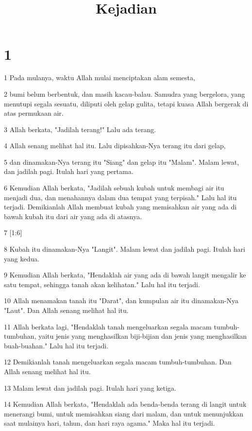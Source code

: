 

\title{Kejadian}


\chapter{1}

\par 1 Pada mulanya, waktu Allah mulai menciptakan alam semesta,
\par 2 bumi belum berbentuk, dan masih kacau-balau. Samudra yang bergelora, yang menutupi segala sesuatu, diliputi oleh gelap gulita, tetapi kuasa Allah bergerak di atas permukaan air.
\par 3 Allah berkata, "Jadilah terang!" Lalu ada terang.
\par 4 Allah senang melihat hal itu. Lalu dipisahkan-Nya terang itu dari gelap,
\par 5 dan dinamakan-Nya terang itu "Siang" dan gelap itu "Malam". Malam lewat, dan jadilah pagi. Itulah hari yang pertama.
\par 6 Kemudian Allah berkata, "Jadilah sebuah kubah untuk membagi air itu menjadi dua, dan menahannya dalam dua tempat yang terpisah." Lalu hal itu terjadi. Demikianlah Allah membuat kubah yang memisahkan air yang ada di bawah kubah itu dari air yang ada di atasnya.
\par 7 [1:6]
\par 8 Kubah itu dinamakan-Nya "Langit". Malam lewat dan jadilah pagi. Itulah hari yang kedua.
\par 9 Kemudian Allah berkata, "Hendaklah air yang ada di bawah langit mengalir ke satu tempat, sehingga tanah akan kelihatan." Lalu hal itu terjadi.
\par 10 Allah menamakan tanah itu "Darat", dan kumpulan air itu dinamakan-Nya "Laut". Dan Allah senang melihat hal itu.
\par 11 Allah berkata lagi, "Hendaklah tanah mengeluarkan segala macam tumbuh-tumbuhan, yaitu jenis yang menghasilkan biji-bijian dan jenis yang menghasilkan buah-buahan." Lalu hal itu terjadi.
\par 12 Demikianlah tanah mengeluarkan segala macam tumbuh-tumbuhan. Dan Allah senang melihat hal itu.
\par 13 Malam lewat dan jadilah pagi. Itulah hari yang ketiga.
\par 14 Kemudian Allah berkata, "Hendaklah ada benda-benda terang di langit untuk menerangi bumi, untuk memisahkan siang dari malam, dan untuk menunjukkan saat mulainya hari, tahun, dan hari raya agama." Maka hal itu terjadi.
